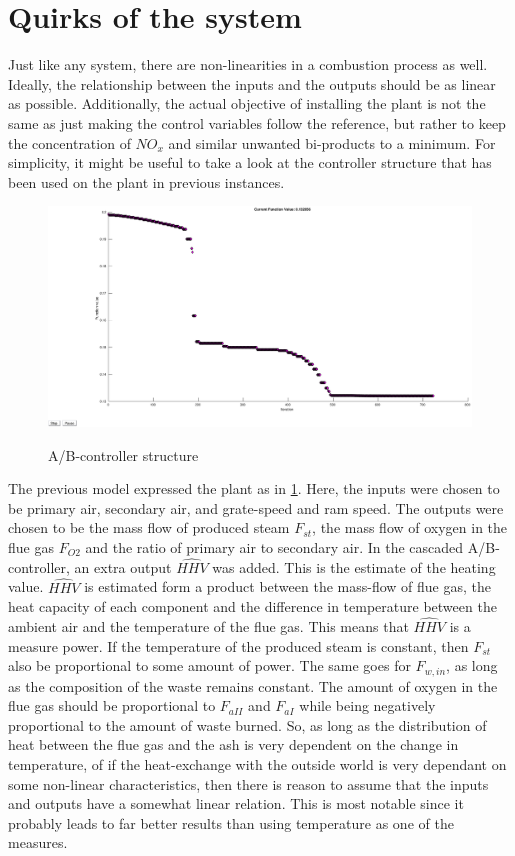 \section{Quirks of the system}

Just like any system, there are non-linearities in a combustion process as well. Ideally, the relationship between the inputs and the outputs should be as linear as possible. Additionally, the actual objective of installing the plant is not the same as just making the control variables follow the reference, but rather to keep the concentration of $NO_x$ and similar unwanted bi-products to a minimum. For simplicity, it might be useful to take a look at the controller structure that has been used on the plant in previous instances. 

\begin{figure}
  \includegraphics[width=\textwidth]{img/autotune_PID_progress.eps}
  \label{fig:AB_controller_structure}
  \caption{A/B-controller structure}
\end{figure}

\noindent
The previous model expressed the plant as in \ref{fig:AB_controller_structure}. Here, the inputs were chosen to be primary air, secondary air, and grate-speed and ram speed. The outputs were chosen to be the mass flow of produced steam $F_{st}$, the mass flow of oxygen in the flue gas $F_{O2}$ and the ratio of primary air to secondary air. In the cascaded A/B-controller, an extra output $\hat{HHV}$ was added. This is the estimate of the heating value. $\hat{HHV}$ is estimated form a product between the mass-flow of flue gas, the heat capacity of each component and the difference in temperature between the ambient air and the temperature of the flue gas. This means that $\hat{HHV}$ is a measure power. If the temperature of the produced steam is constant, then $F_{st}$ also be proportional to some amount of power. The same goes for $F_{w,in}$, as long as the composition of the waste remains constant. The amount  of oxygen in the flue gas should be proportional to $F_{aII}$ and $F_{aI}$ while being negatively proportional to the amount of waste burned. So, as long as the distribution of heat between the flue gas and the ash is very dependent on the change in temperature, of if the heat-exchange with the outside world is very dependant on some non-linear characteristics, then there is reason to assume that the inputs and outputs have a somewhat linear relation. This is most notable since it probably leads to far better results than using temperature as one of the measures. 

